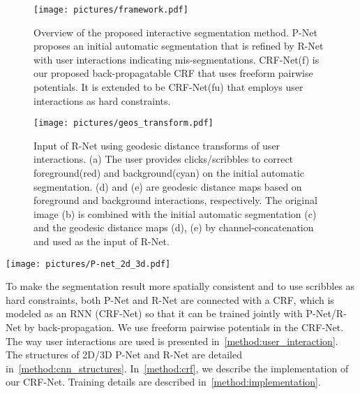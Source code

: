 \documentclass[10pt,journal,compsoc]{IEEEtran}
\begin{document}
\begin{figure}[t]
	\centering
	\texttt{[image: pictures/framework.pdf]}
	\caption[Overview of the proposed interactive segmentation method]{ 
		Overview of the proposed interactive segmentation method. P-Net proposes an initial automatic segmentation that is refined by R-Net with user interactions indicating mis-segmentations. %
		CRF-Net(f) is our proposed back-propagatable CRF that uses freeform pairwise potentials. It is extended to be CRF-Net(fu) that employs user interactions as hard constraints. } 
	\label{fig:framework}
\end{figure}
\begin{figure}[t]
	\centering
	\texttt{[image: pictures/geos\_transform.pdf]}
	\caption[Input of R-Net using Geodesic distance transforms of user interactions]{ 
		Input of R-Net using geodesic distance transforms of user interactions. (a) The user provides clicks/scribbles to correct foreground(red) and background(cyan) on the initial automatic segmentation. (d) and (e) are geodesic distance maps based on foreground and background interactions, respectively. The original image (b) is combined with the initial automatic segmentation (c) and the geodesic distance maps (d), (e) by channel-concatenation and used as the input of R-Net.    } 
	\label{fig:scribble_distance}
\end{figure}
\begin{figure*}[t]
	\centering
	\texttt{[image: pictures/P-net\_2d\_3d.pdf]}
	\caption[The CNN structure of 2D/3D P-Net with CRF-Net.]{ 
		The CNN structure of 2D/3D P-Net with CRF-Net(f). The parameters of convolution layers are (kernel size, output channels, dilation) in dark blue rectangles. Block 1 to block 6 are resolution-preserving. 2D/3D R-Net uses the same structure as 2D/3D P-Net except its input has three additional channels shown in Fig. \ref{fig:scribble_distance} and the CRF-Net(f) is replaced by the CRF-Net(fu) (Section~\ref{method:crf}).} 
	\label{fig:p-net}
\end{figure*}
To make the segmentation result more spatially consistent and to use scribbles as hard constraints, both P-Net and R-Net are connected with a CRF, which is modeled as an RNN (CRF-Net) so that it can be trained jointly with P-Net/R-Net by back-propagation. We use freeform pairwise potentials in the CRF-Net. The way user interactions are used is presented in~\ref{method:user_interaction}. The structures of 2D/3D P-Net and R-Net are detailed in~\ref{method:cnn_structures}. In~\ref{method:crf}, we describe the implementation of our CRF-Net. Training details are described in~\ref{method:implementation}.
\end{document}
